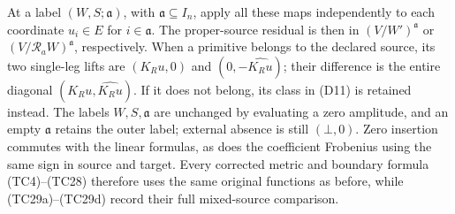 At a label $(W,S;\mathfrak a)$, with $\mathfrak a\subseteq I_n$, apply all these maps independently to each
coordinate $u_i\in E$ for $i\in\mathfrak a$.  The proper-source residual
is then in $(V/W')^{\mathfrak a}$ or $(V/\mathcal R_aW)^{\mathfrak a}$, respectively.
When a primitive belongs to the declared source, its two single-leg
lifts are $(K_Ru,0)$ and $(0,-\widehat{K_Ru})$; their difference
is the entire diagonal $(K_Ru,\widehat{K_Ru})$.  If it does not
belong, its class in (D11) is retained instead.  The labels $W,S,\mathfrak a$
are unchanged by evaluating a zero amplitude, and an empty $\mathfrak a$
retains the outer label; external absence is still $(\bot,0)$.
Zero insertion commutes with the linear formulas, as does the
coefficient Frobenius using the same sign in source and target.
Every corrected metric and boundary formula (TC4)--(TC28) therefore
uses the same original functions as before, while (TC29a)--(TC29d)
record their full mixed-source comparison.

